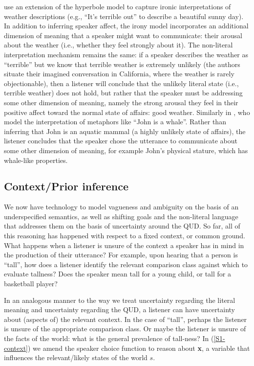 \documentclass{sp}
\newcommand{\gcs}[1]{\textcolor{blue}{[gcs: #1]}}
\newcommand{\mf}[1]{\textcolor{orange}{[mf: #1]}}
\newcommand{\mht}[1]{\textcolor{purple}{[mht: #1]}}
\begin{document}
\cite{kaogoodman2015} use an extension of the hyperbole model to capture ironic interpretations of weather descriptions (e.g., ``It's terrible out'' to describe a beautiful sunny day). In addition to inferring speaker affect, the irony model incorporates an additional dimension of meaning that a speaker might want to communicate: their arousal about the weather (i.e., whether they feel strongly about it). The non-literal interpretation mechanism remains the same: if a speaker describes the weather as ``terrible'' but we know that terrible weather is extremely unlikely (the authors situate their imagined conversation in California, where the weather is rarely objectionable), then a listener will conclude that the unlikely literal state (i.e., terrible weather) does not hold, but rather that the speaker must be addressing some other dimension of meaning, namely the strong arousal they feel in their positive affect toward the normal state of affairs: good weather. Similarly in \cite{kaoetal2014metaphor}, who model the interpretation of metaphors like ``John is a whale''. Rather than inferring that John is an aquatic mammal (a highly unlikely state of affairs), the listener concludes that the speaker chose the utterance to communicate about some other dimension of meaning, for example John's physical stature, which has whale-like properties.

\subsection{Context/Prior inference} \label{context-inference}

We now have technology to model vagueness and ambiguity on the basis of an underspecified semantics, as well as shifting goals and the non-literal language that addresses them on the basis of uncertainty around the QUD. So far, all of this reasoning has happened with respect to a fixed context, or common ground. What happens when a listener is unsure of the context a speaker has in mind in the production of their utterance? %
For example, upon hearing that a person is ``tall'', how does a listener identify the relevant comparison class against which to evaluate tallness? Does the speaker mean tall for a young child, or tall for a basketball player?

In an analogous manner to the way we treat uncertainty regarding the literal meaning and uncertainty regarding the QUD, a listener can have uncertainty about (aspects of) the relevant context. In the case of ``tall'', perhaps the listener is unsure of the appropriate comparison class. Or maybe the listener is unsure of the facts of the world: what is the general prevalence of tall-ness? In (\ref{S1-context}) we amend the speaker choice function to reason about \textbf{x}, a variable that influences the relevant/likely states of the world $s$.
\end{document}
